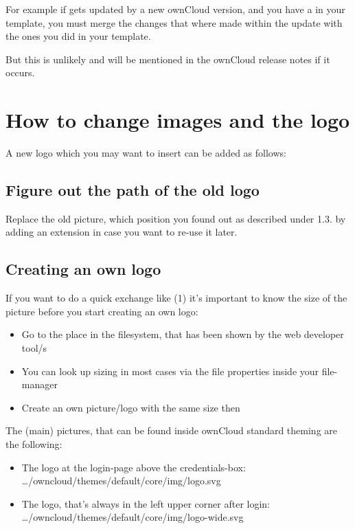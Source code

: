 \documentclass[letterpaper,10pt,english]{sphinxmanual}
\begin{document}
For example if  gets updated by a new
ownCloud version, and you have a 
in your template, you must merge the changes that where made within the update
with the ones you did in your template.

But this is unlikely and will be mentioned in the ownCloud release notes if it occurs.


\section{How to change images and the logo}
\label{core/theming:how-to-change-images-and-the-logo}
A new logo which you may want to insert can be added as follows:


\subsection{Figure out the path of the old logo}
\label{core/theming:figure-out-the-path-of-the-old-logo}
Replace the old picture, which position you found out as described under 1.3. by adding an extension in case you want to re-use it later.


\subsection{Creating an own logo}
\label{core/theming:creating-an-own-logo}
If you want to do a quick exchange like (1) it's important to know the size of the picture before you start creating an own logo:
\begin{itemize}
\item {} 
Go to the place in the filesystem, that has been shown by the web developer tool/s

\item {} 
You can look up sizing in most cases via the file properties inside your file-manager

\item {} 
Create an own picture/logo with the same size then

\end{itemize}

The (main) pictures, that can be found inside ownCloud standard theming are the following:
\begin{itemize}
\item {} 
The logo at the login-page above the credentials-box:                 …/owncloud/themes/default/core/img/logo.svg

\item {} 
The logo, that's always in the left upper corner after login:   …/owncloud/themes/default/core/img/logo-wide.svg

\end{itemize}
\end{document}
